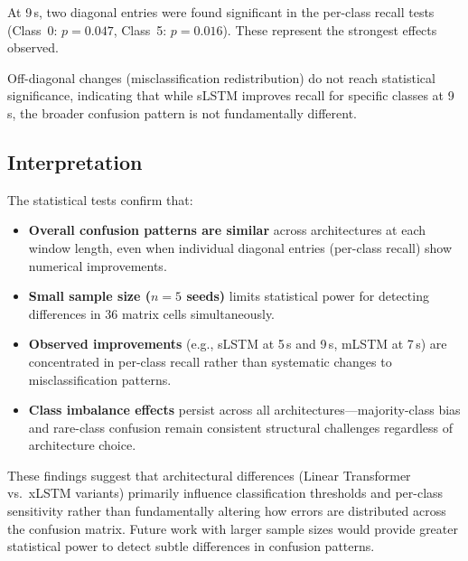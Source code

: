At 9\,s, two diagonal entries were found significant in the per-class recall tests (Class~0: $p=0.047$, Class~5: $p=0.016$). These represent the strongest effects observed.

Off-diagonal changes (misclassification redistribution) do not reach statistical significance, indicating that while \ac{sLSTM} improves recall for specific classes at 9\,s, the broader confusion pattern is not fundamentally different.

\subsection{Interpretation}

The statistical tests confirm that:
\begin{itemize}
\item \textbf{Overall confusion patterns are similar} across architectures at each window length, even when individual diagonal entries (per-class recall) show numerical improvements.
\item \textbf{Small sample size ($n=5$ seeds)} limits statistical power for detecting differences in 36 matrix cells simultaneously.
\item \textbf{Observed improvements} (e.g., \ac{sLSTM} at 5\,s and 9\,s, \ac{mLSTM} at 7\,s) are concentrated in per-class recall rather than systematic changes to misclassification patterns.
\item \textbf{Class imbalance effects} persist across all architectures—majority-class bias and rare-class confusion remain consistent structural challenges regardless of architecture choice.
\end{itemize}

These findings suggest that architectural differences (Linear Transformer vs.\ \ac{xLSTM} variants) primarily influence classification thresholds and per-class sensitivity rather than fundamentally altering how errors are distributed across the confusion matrix. Future work with larger sample sizes would provide greater statistical power to detect subtle differences in confusion patterns.

